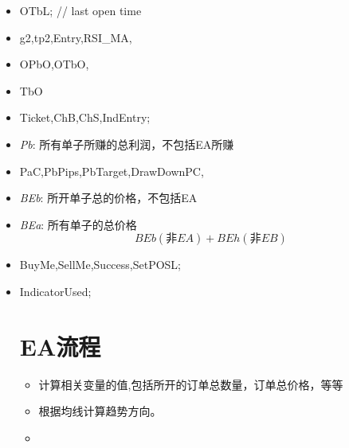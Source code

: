 \begin{itemize}
\item OTbL;                // last open time
\item g2,tp2,Entry,RSI\_MA,

\item OPbO,OTbO,

\item TbO
\item Ticket,ChB,ChS,IndEntry;
\item \textit{Pb}: 所有单子所赚的总利润，不包括EA所赚

\item PaC,PbPips,PbTarget,DrawDownPC,
\item \textit{BEb}: 所开单子总的价格，不包括EA
\item \textit{BEa}: 所有单子的总价格$$BEb(非EA) + BEh(非EB)$$
\item BuyMe,SellMe,Success,SetPOSL;
\item IndicatorUsed;

\section{EA流程}


\begin{itemize}
\item 计算相关变量的值,包括所开的订单总数量，订单总价格，等等
\item 根据均线计算趋势方向。
\item 
\end{itemize}
















\end{itemize}
